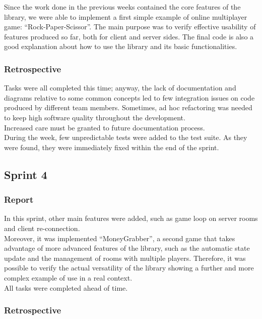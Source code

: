 Since the work done in the previous weeks contained the core features of the library, we were able to implement a first simple example of online multiplayer game: ``Rock-Paper-Scissor''. 
The main purpose was to verify effective usability of features produced so far, both for client and server sides.
The final code is also a good explanation about how to use the library and its basic functionalities.


\subsubsection{Retrospective}
Tasks were all completed this time; anyway, the lack of documentation and diagrams relative to some common concepts led to few integration issues on code produced by different team members. Sometimes, ad hoc refactoring was needed to keep high software quality throughout the development.
\\
Increased care must be granted to future documentation process.
\\
During the week, few unpredictable tests were added to the test suite.
As they were found, they were immediately fixed within the end of the sprint.




\subsection{Sprint 4}
\subsubsection{Report}
In this sprint, other main features were added, such as game loop on server rooms and client re-connection.
\\
Moreover, it was implemented ``MoneyGrabber'', a second game that takes advantage of more advanced features of the library, such as the automatic state update and the management of rooms with multiple players.
Therefore, it was possible to verify the actual versatility of the library showing a further and more complex example of use in a real context.
\\
All tasks were completed ahead of time.


\subsubsection{Retrospective}

